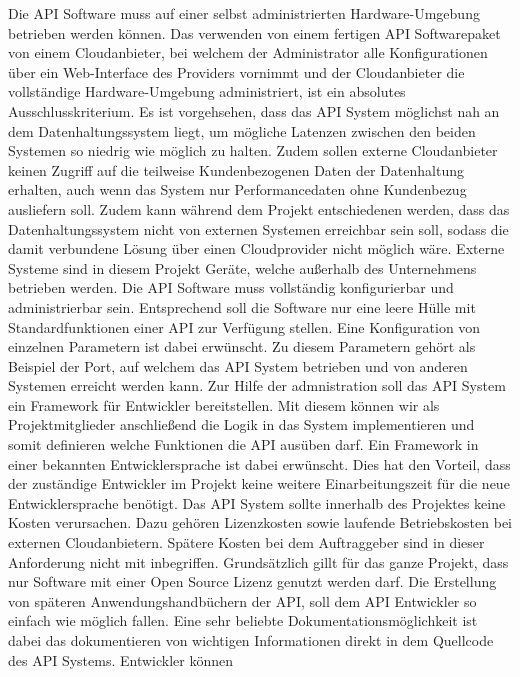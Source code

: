 \begin{outline}
  \1 Die API Software muss auf einer selbst administrierten Hardware-Umgebung
  betrieben werden können. Das verwenden von einem fertigen API Softwarepaket
  von einem Cloudanbieter, bei welchem der Administrator alle Konfigurationen
  über ein Web-Interface des Providers vornimmt und der Cloudanbieter die
  vollständige Hardware-Umgebung administriert, ist ein absolutes
  Ausschlusskriterium. Es ist vorgehsehen, dass das API System möglichst nah an
  dem Datenhaltungssystem liegt, um mögliche Latenzen zwischen den beiden
  Systemen so niedrig wie möglich zu halten. Zudem sollen externe Cloudanbieter
  keinen Zugriff auf die teilweise Kundenbezogenen Daten der Datenhaltung
  erhalten, auch wenn das System nur Performancedaten ohne Kundenbezug
  ausliefern soll. Zudem kann während dem Projekt entschiedenen werden, dass das
  Datenhaltungssystem nicht von externen Systemen erreichbar sein soll, sodass
  die damit verbundene Lösung über einen Cloudprovider nicht möglich wäre.
  Externe Systeme sind in diesem Projekt Geräte, welche außerhalb des
  Unternehmens betrieben werden.
  \1 Die API Software muss vollständig konfigurierbar und administrierbar sein.
  Entsprechend soll die Software nur eine leere Hülle mit Standardfunktionen
  einer API zur Verfügung stellen. Eine Konfiguration von einzelnen Parametern
  ist dabei erwünscht. Zu diesem Parametern gehört als Beispiel der Port, auf
  welchem das API System betrieben und von anderen Systemen erreicht werden
  kann. Zur Hilfe der admnistration soll das API System ein Framework für
  Entwickler bereitstellen. Mit diesem können wir als Projektmitglieder
  anschließend die Logik in das System implementieren und somit definieren
  welche Funktionen die API ausüben darf. Ein Framework in einer bekannten
  Entwicklersprache ist dabei erwünscht. Dies hat den Vorteil, dass der
  zuständige Entwickler im Projekt keine weitere Einarbeitungszeit für die neue
  Entwicklersprache benötigt.
  \1 Das API System sollte innerhalb des Projektes keine Kosten verursachen.
  Dazu gehören Lizenzkosten sowie laufende Betriebskosten bei externen
  Cloudanbietern. Spätere Kosten bei dem Auftraggeber sind in dieser
  Anforderung nicht mit inbegriffen. Grundsätzlich gillt für das ganze Projekt,
  dass nur Software mit einer Open Source Lizenz genutzt werden darf.
  \1 Die Erstellung von späteren Anwendungshandbüchern der API, soll dem API
  Entwickler so einfach wie möglich fallen. Eine sehr beliebte
  Dokumentationsmöglichkeit ist dabei das dokumentieren von wichtigen
  Informationen direkt in dem Quellcode des API Systems. Entwickler können

\end{outline}
